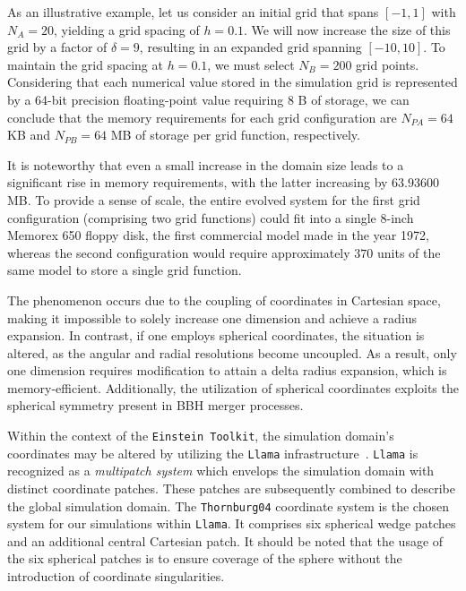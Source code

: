 As an illustrative example, let us consider an initial grid that spans $[-1,1]$ with $N_A=20$, yielding a grid spacing of $h=0.1$. We will now increase the size of this grid by a factor of $\delta=9$, resulting in an expanded grid spanning $[-10,10]$. To maintain the grid spacing at $h=0.1$, we must select $N_B=200$ grid points. Considering that each numerical value stored in the simulation grid is represented by a 64-bit precision floating-point value requiring 8 B of storage, we can conclude that the memory requirements for each grid configuration are $N_{PA}=64$ KB and $N_{PB}=64$ MB of storage per grid function, respectively.

It is noteworthy that even a small increase in the domain size leads to a significant rise in memory requirements, with the latter increasing by $63.93600$ MB. To provide a sense of scale, the entire evolved system for the first grid configuration (comprising two grid functions) could fit into a single 8-inch Memorex 650 floppy disk, the first commercial model made in the year 1972, whereas the second configuration would require approximately $370$ units of the same model to store a single grid function.

The phenomenon occurs due to the coupling of coordinates in Cartesian space, making it impossible to solely increase one dimension and achieve a radius expansion. In contrast, if one employs spherical coordinates, the situation is altered, as the angular and radial resolutions become uncoupled. As a result, only one dimension requires modification to attain a delta radius expansion, which is memory-efficient. Additionally, the utilization of spherical coordinates exploits the spherical symmetry present in \ac{BBH} merger processes.

Within the context of the \texttt{Einstein Toolkit}, the simulation domain's coordinates may be altered by utilizing the \texttt{Llama} infrastructure~\cite{Reisswig2010,PhysRevD.83.044045}. \texttt{Llama} is recognized as a \textit{multipatch system} which envelops the simulation domain with distinct coordinate patches. These patches are subsequently combined to describe the global simulation domain. The \texttt{Thornburg04} coordinate system is the chosen system for our simulations within \texttt{Llama}. It comprises six spherical wedge patches and an additional central Cartesian patch. It should be noted that the usage of the six spherical patches is to ensure coverage of the sphere without the introduction of coordinate singularities.

